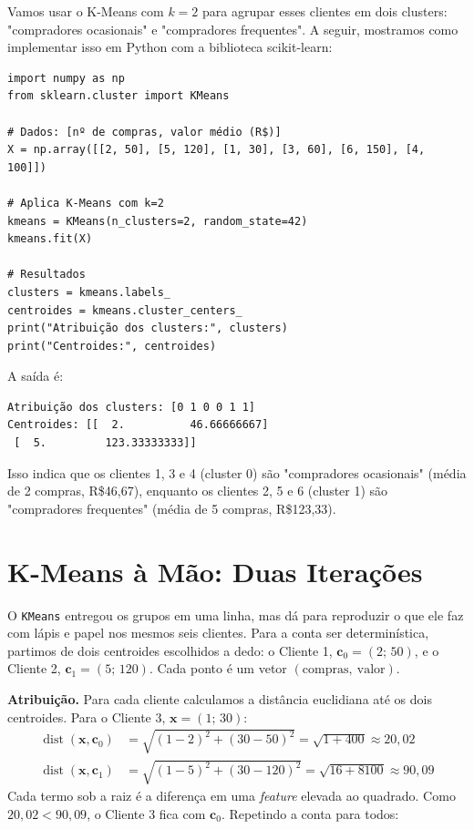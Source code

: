 \documentclass[a4paper,12pt,openany]{book}
\begin{document}
Vamos usar o K-Means com \(k=2\) para agrupar esses clientes em dois clusters: "compradores ocasionais" e "compradores frequentes". A seguir, mostramos como implementar isso em Python com a biblioteca scikit-learn:

\begin{verbatim}
import numpy as np
from sklearn.cluster import KMeans

# Dados: [nº de compras, valor médio (R$)]
X = np.array([[2, 50], [5, 120], [1, 30], [3, 60], [6, 150], [4, 100]])

# Aplica K-Means com k=2
kmeans = KMeans(n_clusters=2, random_state=42)
kmeans.fit(X)

# Resultados
clusters = kmeans.labels_
centroides = kmeans.cluster_centers_
print("Atribuição dos clusters:", clusters)
print("Centroides:", centroides)
\end{verbatim}

A saída é:
\begin{verbatim}
Atribuição dos clusters: [0 1 0 0 1 1]
Centroides: [[  2.          46.66666667]
 [  5.         123.33333333]]
\end{verbatim}

Isso indica que os clientes 1, 3 e 4 (cluster 0) são "compradores ocasionais" (média de 2 compras, R\$46,67), enquanto os clientes 2, 5 e 6 (cluster 1) são "compradores frequentes" (média de 5 compras, R\$123,33).


\section{K-Means à Mão: Duas Iterações}

O \texttt{KMeans} entregou os grupos em uma linha, mas dá para reproduzir o que ele faz com lápis e papel nos mesmos seis clientes. Para a conta ser determinística, partimos de dois centroides escolhidos a dedo: o Cliente 1, \(\mathbf{c}_0 = (2;\,50)\), e o Cliente 2, \(\mathbf{c}_1 = (5;\,120)\). Cada ponto é um vetor \((\text{compras},\ \text{valor})\).

\textbf{Atribuição.} Para cada cliente calculamos a distância euclidiana até os dois centroides. Para o Cliente 3, \(\mathbf{x} = (1;\,30)\):
\begin{align}
\operatorname{dist}(\mathbf{x}, \mathbf{c}_0) &= \sqrt{(1-2)^2 + (30-50)^2} = \sqrt{1 + 400} \approx 20{,}02 \\
\operatorname{dist}(\mathbf{x}, \mathbf{c}_1) &= \sqrt{(1-5)^2 + (30-120)^2} = \sqrt{16 + 8100} \approx 90{,}09
\end{align}
Cada termo sob a raiz é a diferença em uma \textit{feature} elevada ao quadrado. Como \(20{,}02 < 90{,}09\), o Cliente 3 fica com \(\mathbf{c}_0\). Repetindo a conta para todos:
\end{document}
